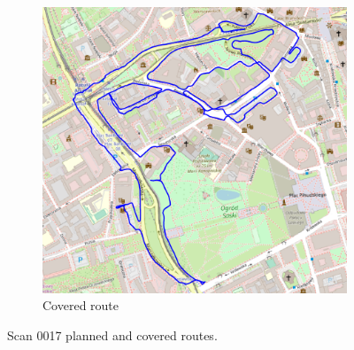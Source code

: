 \documentclass[a4paper,12pt]{book}
\begin{document}
\begin{enumerate}
\begin{figure}[H]
		\begin{subfigure}{.75\textwidth}
			\centering
			\includegraphics[width=1\linewidth]{route_c17}
			\caption{Covered route}
			\label{fig:b17}
		\end{subfigure}
		\caption{Scan 0017 planned and covered routes.}
		\label{fig:fig17}
	\end{figure} 
\end{enumerate}
\end{document}
